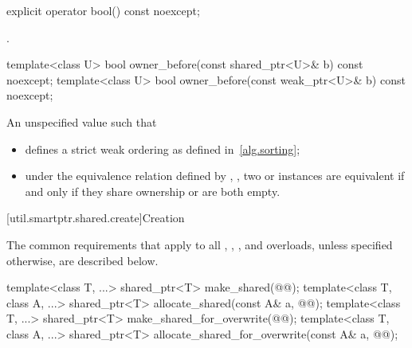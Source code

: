 %
\begin{itemdecl}
explicit operator bool() const noexcept;
\end{itemdecl}

\begin{itemdescr}
\pnum
\returns
{}.
\end{itemdescr}

%
\begin{itemdecl}
template<class U> bool owner_before(const shared_ptr<U>& b) const noexcept;
template<class U> bool owner_before(const weak_ptr<U>& b) const noexcept;
\end{itemdecl}

\begin{itemdescr}
\pnum
\returns
An unspecified value such that
\begin{itemize}
\item {} defines a strict weak ordering as defined in~\ref{alg.sorting};

\item under the equivalence relation defined by ,
, two  or
 instances are equivalent if and only if they share ownership or
are both empty.
\end{itemize}
\end{itemdescr}

[util.smartptr.shared.create]{Creation}

\pnum
The common requirements that apply to all
,
,
, and
 overloads,
unless specified otherwise, are described below.

%
%
\begin{itemdecl}
template<class T, ...>
  shared_ptr<T> make_shared(@@);
template<class T, class A, ...>
  shared_ptr<T> allocate_shared(const A& a, @@);
template<class T, ...>
  shared_ptr<T> make_shared_for_overwrite(@@);
template<class T, class A, ...>
  shared_ptr<T> allocate_shared_for_overwrite(const A& a, @@);
\end{itemdecl}

